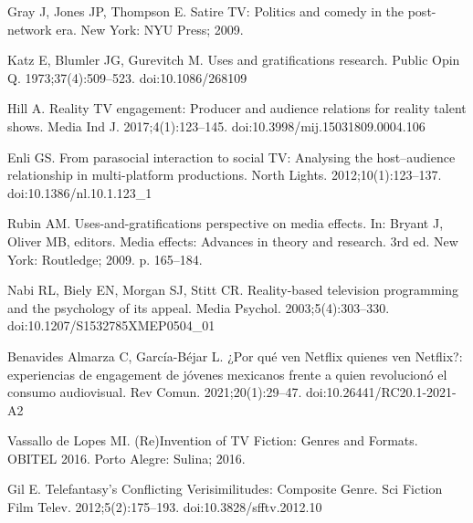 \documentclass[10pt,letterpaper]{article}
\begin{document}
%
%
% 
\begin{thebibliography}{22}

Gray J, Jones JP, Thompson E.
\newblock Satire TV: Politics and comedy in the post-network era.
\newblock New York: NYU Press; 2009.

Katz E, Blumler JG, Gurevitch M.
\newblock Uses and gratifications research.
\newblock Public Opin Q. 1973;37(4):509--523.
\newblock doi:10.1086/268109

Hill A.
\newblock Reality TV engagement: Producer and audience relations for reality talent shows.
\newblock Media Ind J. 2017;4(1):123--145.
\newblock doi:10.3998/mij.15031809.0004.106

Enli GS.
\newblock From parasocial interaction to social TV: Analysing the host–audience relationship in multi-platform productions.
\newblock North Lights. 2012;10(1):123--137.
\newblock doi:10.1386/nl.10.1.123\_1

Rubin AM.
\newblock Uses-and-gratifications perspective on media effects.
\newblock In: Bryant J, Oliver MB, editors. Media effects: Advances in theory and research. 3rd ed. New York: Routledge; 2009. p. 165--184.

Nabi RL, Biely EN, Morgan SJ, Stitt CR.
\newblock Reality-based television programming and the psychology of its appeal.
\newblock Media Psychol. 2003;5(4):303--330.
\newblock doi:10.1207/S1532785XMEP0504\_01

Benavides Almarza C, García-Béjar L.
\newblock ¿Por qué ven Netflix quienes ven Netflix?: experiencias de engagement de jóvenes mexicanos frente a quien revolucionó el consumo audiovisual.
\newblock Rev Comun. 2021;20(1):29--47.
\newblock doi:10.26441/RC20.1-2021-A2

Vassallo de Lopes MI.
\newblock (Re)Invention of TV Fiction: Genres and Formats.
\newblock OBITEL 2016. Porto Alegre: Sulina; 2016.

Gil E.
\newblock Telefantasy's Conflicting Verisimilitudes: Composite Genre.
\newblock Sci Fiction Film Telev. 2012;5(2):175--193.
\newblock doi:10.3828/sfftv.2012.10


\end{thebibliography}
\end{document}
